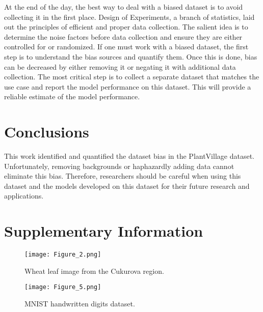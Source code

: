 \documentclass{article}
\begin{document}
At the end of the day, the best way to deal with a biased dataset is to avoid collecting it in the first place. Design of Experiments, a branch of statistics, laid out the principles of efficient and proper data collection\cite{Montgomery2019}. The salient idea is to determine the noise factors before data collection and ensure they are either controlled for or randomized. If one must work with a biased dataset, the first step is to understand the bias sources and quantify them. Once this is done, bias can be decreased by either removing it or negating it with additional data collection. The most critical step is to collect a separate dataset that matches the use case and report the model performance on this dataset. This will provide a reliable estimate of the model performance.

\section{Conclusions}

This work identified and quantified the dataset bias in the PlantVillage dataset. Unfortunately, removing backgrounds or haphazardly adding data cannot eliminate this bias. Therefore, researchers should be careful when using this dataset and the models developed on this dataset for their future research and applications.




\newpage
\renewcommand{\thefigure}{S\arabic{figure}}
\setcounter{figure}{0}

\section{Supplementary Information}

\begin{figure}[h]
\centering
\texttt{[image: Figure\_2.png]}
\caption{\label{fig:Cukurova}Wheat leaf image from the Cukurova region.}

\end{figure}

\begin{figure}[h]
\centering
\texttt{[image: Figure\_5.png]}
\caption{\label{fig:MNIST}MNIST handwritten digits dataset.}
\end{figure}
\end{document}
